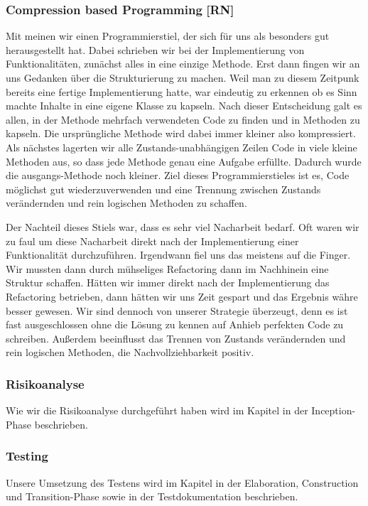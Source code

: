 \documentclass[10pt]{article}
\begin{document}
\subsubsection{\dq Compression based Programming\dq\,\,[RN]}
Mit  meinen wir einen Programmierstiel, der sich für uns als besonders gut 
herausgestellt hat. Dabei schrieben wir bei der Implementierung von Funktionalitäten, zunächst alles in eine einzige 
Methode. Erst dann fingen wir an uns Gedanken über die Strukturierung zu machen. Weil man zu diesem Zeitpunk bereits 
eine fertige Implementierung hatte, war eindeutig zu erkennen ob es Sinn machte Inhalte in eine 
eigene Klasse zu kapseln. Nach dieser Entscheidung galt es allen, in der Methode mehrfach verwendeten Code zu 
finden und in Methoden zu kapseln. Die ursprüngliche Methode wird dabei immer kleiner also kompressiert. 
Als nächstes lagerten wir alle Zustands-unabhängigen Zeilen Code in viele kleine Methoden aus, so dass jede Methode 
genau eine Aufgabe erfüllte. Dadurch wurde die ausgangs-Methode noch kleiner. Ziel dieses Programmierstieles ist 
es, Code möglichst gut wiederzuverwenden und eine Trennung zwischen Zustands verändernden und rein logischen Methoden
zu schaffen.\par 
\medskip 
Der Nachteil dieses Stiels war, dass es sehr viel Nacharbeit bedarf. Oft waren wir zu faul um diese Nacharbeit direkt 
nach der Implementierung einer Funktionalität durchzuführen.  Irgendwann fiel uns das meistens auf die Finger. 
Wir mussten dann durch mühseliges Refactoring dann im Nachhinein eine Struktur schaffen. Hätten wir immer direkt nach 
der Implementierung das Refactoring betrieben, dann hätten wir uns Zeit gespart und das Ergebnis währe besser gewesen.
Wir sind dennoch von unserer Strategie überzeugt, denn es ist fast ausgeschlossen ohne die Lösung zu kennen auf Anhieb 
perfekten Code zu schreiben. Außerdem beeinflusst das Trennen von Zustands verändernden und rein logischen Methoden, 
die Nachvollziehbarkeit positiv. 
\subsubsection{Risikoanalyse}
Wie wir die Risikoanalyse durchgeführt haben wird im Kapitel  in der Inception-Phase beschrieben.
\subsubsection{Testing}
Unsere Umsetzung des Testens wird im Kapitel  in der Elaboration, Construction
und Transition-Phase sowie in der Testdokumentation beschrieben.
\end{document}
